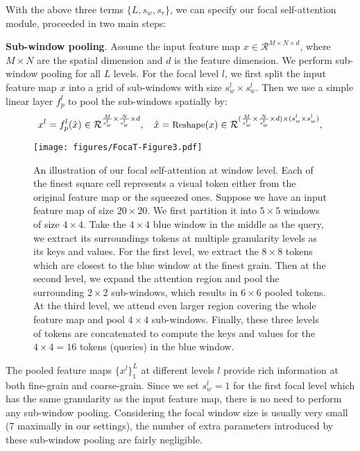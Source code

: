 \documentclass{article}
\begin{document}
With the above three terms $\{L, s_w, s_r\}$, we can specify our focal self-attention module, proceeded in two main steps:

\textbf{Sub-window pooling}. Assume the input feature map $x \in \mathcal{R}^{M \times N \times d}$, where $M\times N$ are the spatial dimension and $d$ is the feature dimension. We perform sub-window pooling for all $L$ levels. For the focal level $l$, we first split the input feature map $x$ into a grid of sub-windows with size $s_w^l \times s_w^l$. Then we use a simple linear layer $f_p^l$ to pool the sub-windows spatially by:
\begin{equation}
\small
    x^l = f^l_p(\hat{x}) \in \mathcal{R}^{\frac{M}{s_w^l} \times \frac{N}{s_w^l} \times d}, \quad \hat{x}=\text{Reshape}(x)\in \mathcal{R}^{(\frac{M}{s_w^l} \times \frac{N}{s_w^l} \times d) \times (s_w^l \times s_w^l)},  
    \label{eq:pool}
\end{equation}

\begin{figure}[t]
\centering
    \texttt{[image: figures/FocaT-Figure3.pdf]}
  \caption{An illustration of our focal self-attention at window level. Each of the finest square cell represents a visual token either from the original feature map or the squeezed ones. Suppose we have an input feature map of size $20 \times 20$. We first partition it into $5 \times 5$ windows of size $4 \times 4$. Take the $4 \times 4$ blue window in the middle as the query, we extract its surroundings tokens at multiple granularity levels as its keys and values. For the first level, we extract the $8 \times 8$ tokens which are closest to the blue window at the finest grain. Then at the second level, we expand the attention region and pool the surrounding $2 \times 2$ sub-windows, which results in $6 \times 6$ pooled tokens. At the third level, we attend even larger region covering the whole feature map and pool $4\times 4$ sub-windows. Finally, these three levels of tokens are concatenated to compute the keys and values for the $4\times4 =16$ tokens (queries) in the blue window.}
  \label{fig:window_focal_attention}
\end{figure}

The pooled feature maps $\{x^l\}_1^L$ at different levels $l$ provide rich information at both fine-grain and coarse-grain. Since we set $s_w^l=1$ for the first focal level which has the same granularity as the input feature map, there is no need to perform any sub-window pooling. Considering the focal window size is usually very small (7 maximally in our settings), the number of extra parameters introduced by these sub-window pooling are fairly negligible.
\end{document}
